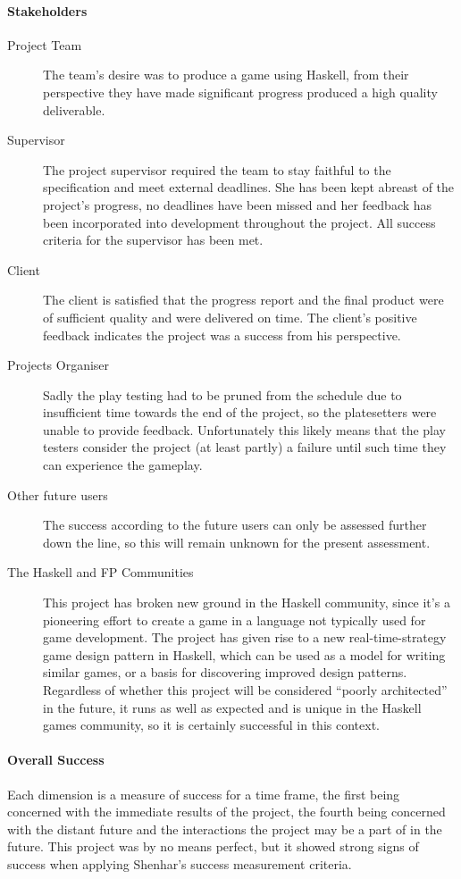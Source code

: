 \paragraph{Stakeholders}
\begin{description}
    \item[Project Team] The team's desire was to produce a game using Haskell, from their perspective they have made significant progress produced a high quality deliverable.
    \item[Supervisor] The project supervisor required the team to stay faithful to the specification and meet external deadlines. She has been kept abreast of the project's progress, no deadlines have been missed and her feedback has been incorporated into development throughout the project. All success criteria for the supervisor has been met.
    \item[Client] The client is satisfied that the progress report and the final product were of sufficient quality and were delivered on time. The client's positive feedback indicates the project was a success from his perspective.
    \item[Projects Organiser} The project organiser required that all external deadlines were met, and since they were the project can only be considered successful from his point of view.
    \item[Play testers] Sadly the play testing had to be pruned from the schedule due to insufficient time towards the end of the project, so the platesetters were unable to provide feedback. Unfortunately this likely means that the play testers consider the project (at least partly) a failure until such time they can experience the gameplay.
    \item[Other future users] The success according to the future users can only be assessed further down the line, so this will remain unknown for the present assessment.
    \item[The Haskell and FP Communities] This project has broken new ground in the Haskell community, since it's a pioneering effort to create a game in a language not typically used for game development. The project has given rise to a new real-time-strategy game design pattern in Haskell, which can be used as a model for writing similar games, or a basis for discovering improved design patterns. Regardless of whether this project will be considered ``poorly architected'' in the future, it runs as well as expected and is unique in the Haskell games community, so it is certainly successful in this context.
\end{description}

\paragraph{Overall Success}
Each dimension is a measure of success for a time frame, the first being concerned with the immediate results of the project, the fourth being concerned with the distant future and the interactions the project may be a part of in the future. This project was by no means perfect, but it showed strong signs of success when applying Shenhar's success measurement criteria.

